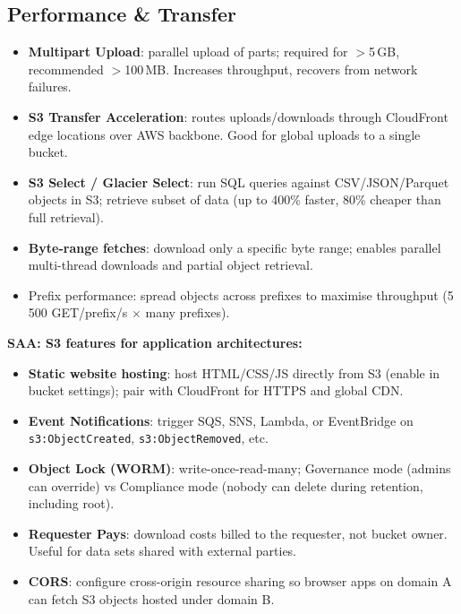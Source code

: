 \subsection{Performance \& Transfer}

\begin{itemize}
  \item \textbf{Multipart Upload}: parallel upload of parts; required for $>$5\,GB, recommended $>$100\,MB.
        Increases throughput, recovers from network failures.
  \item \textbf{S3 Transfer Acceleration}: routes uploads/downloads through CloudFront edge
        locations over AWS backbone. Good for global uploads to a single bucket.
  \item \textbf{S3 Select / Glacier Select}: run SQL queries against CSV/JSON/Parquet objects
        in S3; retrieve subset of data (up to 400\% faster, 80\% cheaper than full retrieval).
  \item \textbf{Byte-range fetches}: download only a specific byte range; enables parallel
        multi-thread downloads and partial object retrieval.
  \item Prefix performance: spread objects across prefixes to maximise throughput
        (5\,500 GET/prefix/s $\times$ many prefixes).
\end{itemize}

\begin{saadepth}
\textbf{SAA: S3 features for application architectures:}
\begin{itemize}
  \item \textbf{Static website hosting}: host HTML/CSS/JS directly from S3 (enable in bucket
        settings); pair with CloudFront for HTTPS and global CDN.
  \item \textbf{Event Notifications}: trigger SQS, SNS, Lambda, or EventBridge on
        \texttt{s3:ObjectCreated}, \texttt{s3:ObjectRemoved}, etc.
  \item \textbf{Object Lock (WORM)}: write-once-read-many; Governance mode (admins can override)
        vs Compliance mode (nobody can delete during retention, including root).
  \item \textbf{Requester Pays}: download costs billed to the requester, not bucket owner.
        Useful for data sets shared with external parties.
  \item \textbf{CORS}: configure cross-origin resource sharing so browser apps on domain A
        can fetch S3 objects hosted under domain B.
\end{itemize}
\end{saadepth}

